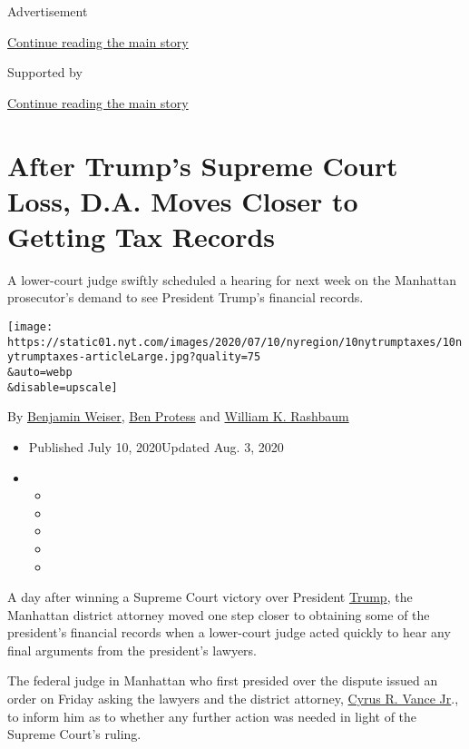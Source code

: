 Advertisement

\protect\hyperlink{after-top}{Continue reading the main story}

Supported by

\protect\hyperlink{after-sponsor}{Continue reading the main story}

\hypertarget{after-trumps-supreme-court-loss-da-moves-closer-to-getting-tax-records}{%
\section{After Trump's Supreme Court Loss, D.A. Moves Closer to Getting
Tax
Records}\label{after-trumps-supreme-court-loss-da-moves-closer-to-getting-tax-records}}

A lower-court judge swiftly scheduled a hearing for next week on the
Manhattan prosecutor's demand to see President Trump's financial
records.

\texttt{[image: https://static01.nyt.com/images/2020/07/10/nyregion/10nytrumptaxes/10nytrumptaxes-articleLarge.jpg?quality=75\\\&auto=webp\\\&disable=upscale]}

By \href{https://www.nytimes.com/by/benjamin-weiser}{Benjamin Weiser},
\href{https://www.nytimes.com/by/ben-protess}{Ben Protess} and
\href{https://www.nytimes.com/by/william-k-rashbaum}{William K.
Rashbaum}

\begin{itemize}
\item
  Published July 10, 2020Updated Aug. 3, 2020
\item
  \begin{itemize}
  \item
  \item
  \item
  \item
  \item
  \end{itemize}
\end{itemize}

A day after winning a Supreme Court victory over President
\href{https://www.nytimes.com/2020/07/13/nyregion/cy-vance-manhattan-da-trump.html}{Trump},
the Manhattan district attorney moved one step closer to obtaining some
of the president's financial records when a lower-court judge acted
quickly to hear any final arguments from the president's lawyers.

The federal judge in Manhattan who first presided over the dispute
issued an order on Friday asking the lawyers and the district attorney,
\href{https://www.nytimes.com/2020/07/13/nyregion/cy-vance-manhattan-da-trump.html}{Cyrus
R. Vance Jr}., to inform him as to whether any further action was needed
in light of the Supreme Court's ruling.

